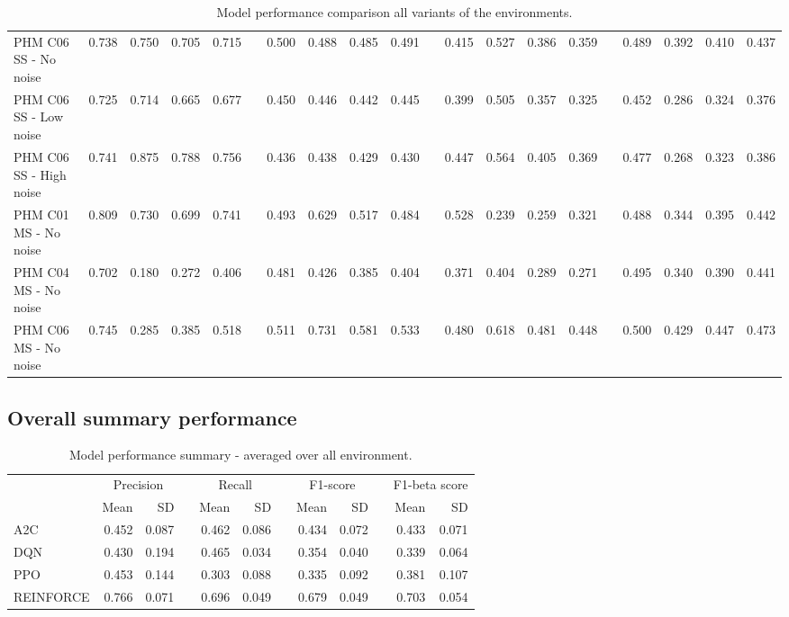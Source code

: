 \documentclass[a4paper, 12pt]{article}
\newcommand{\rowspace}[1]{\renewcommand{\arraystretch}{#1}}
\begin{document}
\begin{landscape}
\begin{table}
\begin{tabular}{@{}l rrrr c rrrr c rrrr c rrrr@{}}
			PHM C06 SS - No noise &0.738 &0.750 &0.705 & 0.715 & & 0.500 &0.488 &0.485 &0.491 & &0.415 &0.527 &0.386 &0.359 & &0.489 &0.392 &0.410&0.437\\
			PHM C06 SS - Low noise &0.725 &0.714 &0.665 & 0.677 & & 0.450 &0.446 &0.442 &0.445 & &0.399 &0.505 &0.357 &0.325 & &0.452 &0.286 &0.324&0.376\\
			PHM C06 SS - High noise &0.741 &0.875 &0.788 & 0.756 & & 0.436 &0.438 &0.429 &0.430 & &0.447 &0.564 &0.405 &0.369 & &0.477 &0.268 &0.323&0.386\\ \midrule
				
			PHM C01 MS - No noise &0.809 &0.730 &0.699 & 0.741 & & 0.493 &0.629 &0.517 &0.484 & &0.528 &0.239 &0.259 &0.321 & &0.488 &0.344 &0.395&0.442\\
			PHM C04 MS - No noise &0.702 &0.180 &0.272 & 0.406 & & 0.481 &0.426 &0.385 &0.404 & &0.371 &0.404 &0.289 &0.271 & &0.495 &0.340 &0.390&0.441\\
			PHM C06 MS - No noise &0.745 &0.285 &0.385 & 0.518 & & 0.511 &0.731 &0.581 &0.533 & &0.480 &0.618 &0.481 &0.448 & &0.500 &0.429 &0.447&0.473\\

			\bottomrule
		\end{tabular}
		\caption{Model performance comparison all variants of the environments.}
		\label{tbl:DetailedMetrics}
	\end{table}
\end{landscape}
\restoregeometry %


\subsection{Overall summary performance}

\begin{table}[hbt!]\centering
	\sffamily
	\rowspace{1.3}
	\begin{tabular}{@{}l rr c rr c rr c rr@{}}
		\arrayrulecolor{black!40}\toprule
		& \multicolumn{2}{c}{Precision} & \phantom{i} & \multicolumn{2}{c}{Recall} & \phantom{i} & \multicolumn{2}{c}{F1-score} & \phantom{i} & \multicolumn{2}{c}{F1-beta score} \\
		\cmidrule{2-3} \cmidrule{5-6} \cmidrule{8-9} \cmidrule{11-12} 
		
		&Mean &SD & &Mean &SD & &Mean &SD& &Mean & SD\\ \midrule
		A2C & 0.452 & 0.087 & &0.462 & 0.086 & & 0.434 & 0.072 & &0.433 &0.071 \\
		DQN & 0.430 & 0.194 & &0.465 & 0.034 & & 0.354 & 0.040 & &0.339 &0.064 \\
		PPO & 0.453 & 0.144 & &0.303 & 0.088 & & 0.335 & 0.092 & &0.381 &0.107 \\
		REINFORCE & 0.766 & 0.071 & &0.696 & 0.049 & & 0.679 & 0.049 & &0.703 &0.054 \\
			
		\bottomrule
	\end{tabular}
	\caption{Model performance summary - averaged over all environment.}
	\label{tbl:OverallSummary}
\end{table}
\end{document}
